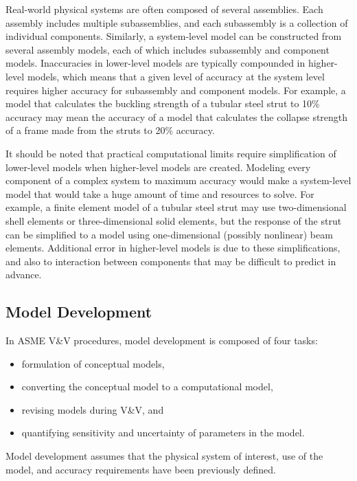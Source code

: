 Real-world physical systems are often composed of several assemblies.
Each assembly includes multiple subassemblies, and each subassembly is a collection of individual components.
Similarly, a system-level model can be constructed from several assembly models, each of which includes subassembly and component models.
Inaccuracies in lower-level models are typically compounded in higher-level models, which means that a given level of accuracy at the system level requires higher accuracy for subassembly and component models.
For example, a model that calculates the buckling strength of a tubular steel strut to 10\% accuracy may mean the accuracy of a model that calculates the collapse strength of a frame made from the struts to 20\% accuracy.

It should be noted that practical computational limits require simplification of lower-level models when higher-level models are created.
Modeling every component of a complex system to maximum accuracy would make a system-level model that would take a huge amount of time and resources to solve.
For example, a finite element model of a tubular steel strut may use two-dimensional shell elements or three-dimensional solid elements, but the response of the strut can be simplified to a model using one-dimensional (possibly nonlinear) beam elements.
Additional error in higher-level models is due to these simplifications, and also to interaction between components that may be difficult to predict in advance.

\subsection{Model Development}

In ASME V\&V procedures, model development is composed of four tasks:
\begin{itemize}
\item formulation of conceptual models,
\item converting the conceptual model to a computational model,
\item revising models during V\&V,
and 
\item quantifying sensitivity and uncertainty of parameters in the model.
\end{itemize}
Model development assumes that the physical system of interest, use of the model, and accuracy requirements have been previously defined.


